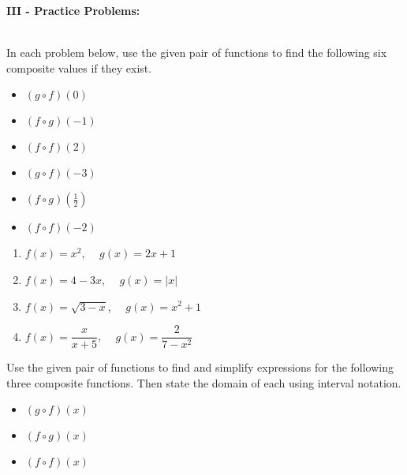 \documentclass[12pt]{article}
\theoremstyle{definition}
\begin{document}
{\bf III - Practice Problems:}\\
\ \par
In each problem below, use the given pair of functions to find the following six composite values if they exist.

\begin{multicols}{3}
\begin{itemize}
\item  $(g\circ f)(0)$
\item  $(f\circ g)(-1)$
\item  $(f \circ f)(2)$
\end{itemize}
\end{multicols}

\begin{multicols}{3}
\begin{itemize}
\item  $(g\circ f)(-3)$
\item  $(f\circ g)\left(\frac{1}{2}\right)$
\item  $(f \circ f)(-2)$
\end{itemize}
\end{multicols}

\begin{multicols}{2}
\begin{enumerate}
\item[1.]  $f(x) = x^2$, \ \ $g(x) = 2x+1$\\
\item[2.]  $f(x) = 4-3x$, \ \ $g(x) = |x|$\\
\item[3.]  $f(x) = \sqrt{3-x}$, \ \ $g(x) = x^2+1$\\
\item[4.]  $f(x) = \dfrac{x}{x+5}$, \ \ $g(x) = \dfrac{2}{7-x^2}$\\
\end{enumerate}
\end{multicols}

Use the given pair of functions to find and simplify expressions for the following three composite functions.  Then state the domain of each using interval notation.

\begin{multicols}{3}
\begin{itemize}
\item  $(g \circ f)(x)$
\item  $(f \circ g)(x)$
\item  $(f \circ f)(x)$
\end{itemize}
\end{multicols}
\end{document}
